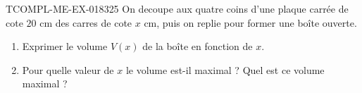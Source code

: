 \begin{exercice}{TCOMPL-ME-EX-018}{3}{25}
On decoupe aux quatre coins d'une plaque carrée de cote $20$ cm des carres de cote $x$ cm, puis on replie pour former une boîte ouverte.
\begin{enumerate}
  \item Exprimer le volume $V(x)$ de la boîte en fonction de $x$.
  \item Pour quelle valeur de $x$ le volume est-il maximal ? Quel est ce volume maximal ?
\end{enumerate}

\end{exercice}
